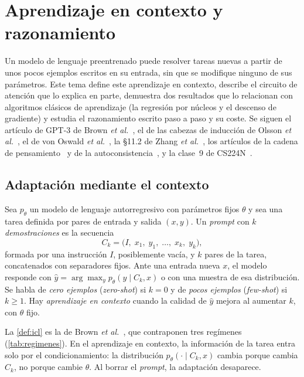 \chapter{Aprendizaje en contexto y razonamiento}
\label{tema:1}

Un modelo de lenguaje preentrenado puede resolver tareas nuevas a partir de unos pocos ejemplos escritos en su entrada, sin que se modifique ninguno de sus parámetros. Este tema define este aprendizaje en contexto, describe el circuito de atención que lo explica en parte, demuestra dos resultados que lo relacionan con algoritmos clásicos de aprendizaje (la regresión por núcleos y el descenso de gradiente) y estudia el razonamiento escrito paso a paso y su coste. Se siguen el artículo de GPT-3 de Brown \emph{et al.}~\cite{brown}, el de las cabezas de inducción de Olsson \emph{et al.}~\cite{olsson}, el de von Oswald \emph{et al.}~\cite{vonoswald}, la §11.2 de Zhang \emph{et al.}~\cite{d2l}, los artículos de la cadena de pensamiento~\cite{wei-cot,kojima} y de la autoconsistencia~\cite{wang-sc}, y la clase~9 de CS224N~\cite{cs224n}.

\section{Adaptación mediante el contexto}

\begin{definicion}\label{def:icl}
Sea $p_\theta$ un modelo de lenguaje autorregresivo con parámetros fijos $\theta$ y sea una tarea definida por pares de entrada y salida $(x,y)$. Un \emph{prompt} con $k$ \emph{demostraciones} es la secuencia
\[
C_k=\bigl(I,\;x_1,\;y_1,\;\dots,\;x_k,\;y_k\bigr),
\]
formada por una instrucción $I$, posiblemente vacía, y $k$ pares de la tarea, concatenados con separadores fijos. Ante una entrada nueva $x$, el modelo responde con $\hat y=\arg\max_y p_\theta(y\mid C_k,x)$ o con una muestra de esa distribución. Se habla de \emph{cero ejemplos} (\emph{zero-shot}) si $k=0$ y de \emph{pocos ejemplos} (\emph{few-shot}) si $k\ge 1$. Hay \emph{aprendizaje en contexto} cuando la calidad de $\hat y$ mejora al aumentar $k$, con $\theta$ fijo.
\end{definicion}

La \cref{def:icl} es la de Brown \emph{et al.}~\cite[§2]{brown}, que contraponen tres regímenes (\cref{tab:regimenes}). En el aprendizaje en contexto, la información de la tarea entra solo por el condicionamiento: la distribución $p_\theta(\cdot\mid C_k,x)$ cambia porque cambia $C_k$, no porque cambie $\theta$. Al borrar el \emph{prompt}, la adaptación desaparece.

